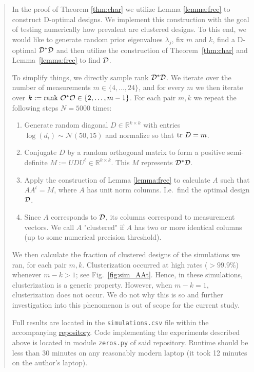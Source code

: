 \begin{quote}
  In the proof of Theorem \ref{thm:char} we utilize Lemma
\ref{lemma:free} to construct D-optimal designs. We implement this
construction with the goal of testing numerically how prevalent are
clustered designs. To this end, we would like to generate random prior
eigenvalues $\lambda_j$, fix $m$ and $k$, find a D-optimal
$\mathcal{D}^*\mathcal{D}$ and then utilize the construction of
Theorem~\ref{thm:char} and Lemma~\ref{lemma:free} to find $\mathcal{D}$.


To simplify things, we directly sample rank $\mathcal{D}^*\mathcal{D}$. We iterate
over the number of measurements $m \in \{4,\dots, 24\}$, and for every
$m$ we then iterate over $k:=\textup{rank}\  \mathcal{O}^*\mathcal{O} \in \{2,\dots,
m-1\}$. For each pair $m,k$ we repeat the following steps $N=5000$
times:
\begin{enumerate}
\item Generate random diagonal $D\in \mathbb{R}^{k\times k}$ with
  entries $\log (d_i) \sim \mathcal{N}(50,15)$ and normalize so that
  $\textup{tr}\ D = m$. 
\item Conjugate $D$ by a random orthogonal matrix to form a positive
  semi-definite $M := UDU^t \in \mathbb{R}^{k\times k}$. This $M$
  represents $\mathcal{D}^*\mathcal{D}$.
\item Apply the construction of Lemma \ref{lemma:free} to calculate
  $A$ such that $AA^t = M$, where $A$ has unit norm columns. I.e.~find
  the optimal design $\mathcal{D}$.
\item Since $A$ corresponds to $\mathcal{D}$, its columns correspond to
  measurement vectors. We call $A$ "clustered" if $A$ has two or more
  identical columns (up to some numerical precision threshold).
\end{enumerate}
We then calculate the fraction of clustered designs of the simulations
we ran, for each pair $m,k$. Clusterization occurred at high rates
($>99.9\%$) whenever $m-k > 1$; see Fig.~\ref{fig:sim_AAt}. Hence, in
these simulations, clusterization is a generic property. However, when
$m-k = 1$, clusterization does not occur. We do not why this is so and
further investigation into this phenomenon is out of scope for the
current study.

Full results are located in the \texttt{simulations.csv} file within
the accompanying \href{https://github.com/yairdaon/OED}{repository}.
Code implementing the experiments described above is located in module
\texttt{zeros.py} of said repository. Runtime should be less than 30
minutes on any reasonably modern laptop (it took 12 minutes on the
author's laptop).
\end{quote}

